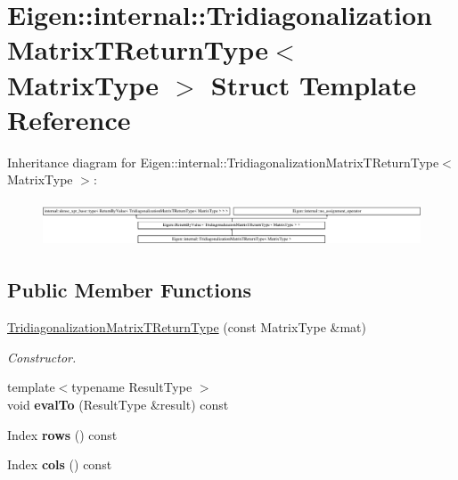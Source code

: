 \hypertarget{struct_eigen_1_1internal_1_1_tridiagonalization_matrix_t_return_type}{}\section{Eigen\+::internal\+::Tridiagonalization\+Matrix\+T\+Return\+Type$<$ Matrix\+Type $>$ Struct Template Reference}
\label{struct_eigen_1_1internal_1_1_tridiagonalization_matrix_t_return_type}
Inheritance diagram for Eigen\+::internal\+::Tridiagonalization\+Matrix\+T\+Return\+Type$<$ Matrix\+Type $>$\+:\begin{figure}[H]
\begin{center}
\leavevmode
\includegraphics[height=1.361426cm]{struct_eigen_1_1internal_1_1_tridiagonalization_matrix_t_return_type}
\end{center}
\end{figure}
\subsection*{Public Member Functions}
\begin{DoxyCompactItemize}
\item 
\mbox{\hyperlink{struct_eigen_1_1internal_1_1_tridiagonalization_matrix_t_return_type_ac49f3c4df8b40dfa002c6e04e3d1b97f}{Tridiagonalization\+Matrix\+T\+Return\+Type}} (const Matrix\+Type \&mat)
\begin{DoxyCompactList}\small\item\em Constructor. \end{DoxyCompactList}\item 
\mbox{\label{struct_eigen_1_1internal_1_1_tridiagonalization_matrix_t_return_type_a8e7c1fdb5f9e55ac810b3470484db76a}} 
{\footnotesize template$<$typename Result\+Type $>$ }\\void {\bfseries eval\+To} (Result\+Type \&result) const
\item 
\mbox{\label{struct_eigen_1_1internal_1_1_tridiagonalization_matrix_t_return_type_a273acab55c1ce70ad833d123ac65bbe1}} 
Index {\bfseries rows} () const
\item 
\mbox{\label{struct_eigen_1_1internal_1_1_tridiagonalization_matrix_t_return_type_aae70afbdf370aa7c9b66fba3da799b06}} 
Index {\bfseries cols} () const
\end{DoxyCompactItemize}
